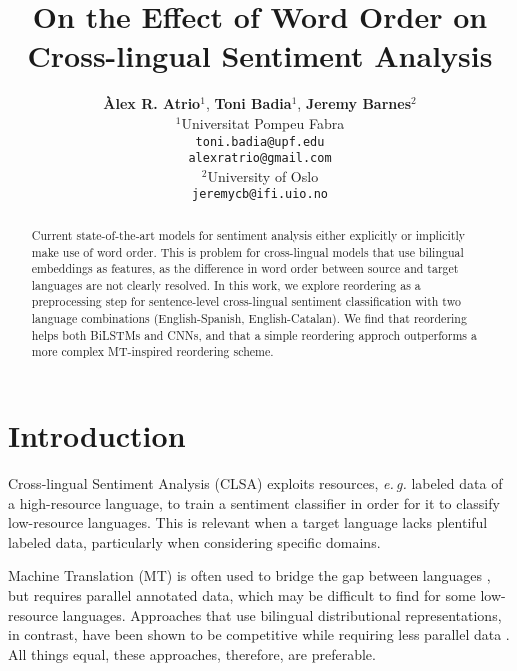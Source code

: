 \documentclass[11pt,a4paper]{article}
\title{On the Effect of Word Order on Cross-lingual Sentiment Analysis}
\author {\textbf{Àlex R. Atrio$^1$}, \textbf{Toni Badia$^{1}$}, \textbf{Jeremy Barnes$^{2}$}\\[5pt]
$^1$Universitat Pompeu Fabra\\
{\tt toni.badia@upf.edu} \\[1pt]
{\tt alexratrio@gmail.com} \\[5pt]
$^2$University of Oslo\\
{\tt jeremycb@ifi.uio.no}
}
\date{}
\newcommand{\eg}{\textit{e.\,g.}\xspace}
\begin{document}
\maketitle
\begin{abstract}
Current state-of-the-art models for sentiment analysis
either explicitly or implicitly make use of word order.
This is problem for cross-lingual models that
use bilingual embeddings as features, as the difference
in word order between source and target languages are
not clearly resolved. In this work, we explore reordering
as a preprocessing step for sentence-level cross-lingual sentiment
classification with two language combinations
(English-Spanish, English-Catalan). We find that reordering
 helps both BiLSTMs and CNNs, and that a simple reordering
approch outperforms a more complex MT-inspired reordering
scheme.


\end{abstract}


\section{Introduction}




Cross-lingual Sentiment Analysis (CLSA) exploits resources, \eg labeled data of a high-resource language, to train a sentiment classifier in order for it to classify low-resource languages. This is relevant when a target language lacks plentiful labeled data, particularly when considering specific domains. 

Machine Translation (MT) is often used to bridge the gap between languages \cite{Banea2008,Balahur2014d}, but requires parallel annotated data, which may be difficult to find for some low-resource languages. Approaches that use bilingual distributional representations, in contrast, have been shown to be competitive while requiring less parallel data \cite{Chen2016,Barnes2018b}. All things equal, these approaches, therefore, are preferable.
\end{document}
